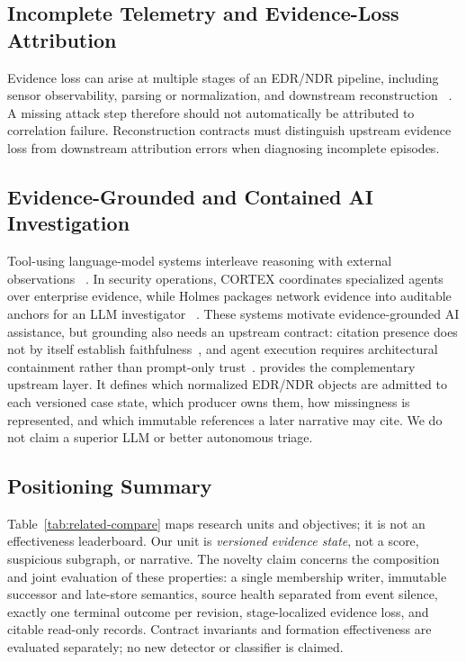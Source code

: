 \subsection{Incomplete Telemetry and Evidence-Loss Attribution}

Evidence loss can arise at multiple stages of an EDR/NDR pipeline, including sensor
observability, parsing or normalization, and downstream reconstruction
~\cite{missingmodality2024,vaseghipanah2026blindspots}. A missing attack step therefore
should not automatically be attributed to correlation failure. Reconstruction contracts must
distinguish upstream evidence loss from downstream attribution errors when diagnosing
incomplete episodes.

\subsection{Evidence-Grounded and Contained AI Investigation}

Tool-using language-model systems interleave reasoning with external observations
~\cite{react2023}. In security operations, CORTEX coordinates specialized agents over enterprise
evidence, while Holmes packages network evidence into auditable anchors for an LLM investigator
~\cite{cortex2025,auditableddos2026}. These systems motivate evidence-grounded AI assistance, but
grounding also needs an upstream contract: citation presence does not by itself establish
faithfulness~\cite{alce2023,ragfaithfulness2025}, and agent execution requires architectural
containment rather than prompt-only trust~\cite{isolategpt2025}. \trustepisode provides the complementary upstream layer. It defines which normalized EDR/NDR
objects are admitted to each versioned case state, which producer owns them, how missingness is
represented, and which immutable references a later narrative may cite.
We do not claim a superior LLM or better autonomous triage.

\subsection{Positioning Summary}

Table~\ref{tab:related-compare} maps research units and objectives; it is not an effectiveness
leaderboard. Our unit is \emph{versioned evidence state}, not a score, suspicious subgraph, or
narrative. The novelty claim concerns the composition and joint evaluation of these properties:
a single membership writer, immutable successor and late-store semantics, source health
separated from event silence, exactly one terminal outcome per revision, stage-localized
evidence loss, and citable read-only records. Contract invariants and formation
effectiveness are evaluated separately; no new detector or classifier is claimed.

